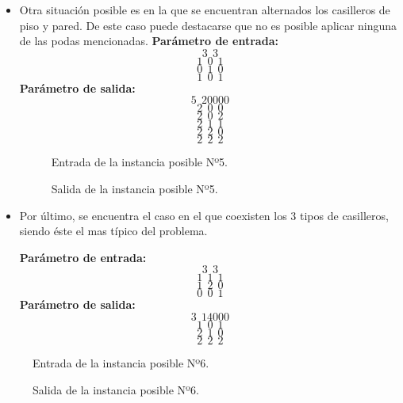 \begin{itemize}
\item Otra situación posible es en la que se encuentran alternados los casilleros de piso y pared. De este caso puede destacarse que no es posible aplicar ninguna de las podas mencionadas.\newline
\textbf{Parámetro de entrada:} 
$$3\ \ 3$$
$$1\ \ 0\ \ 1$$
$$0\ \ 1\ \ 0$$
$$1\ \ 0\ \ 1$$
\textbf{Parámetro de salida:} 
$$5\ \ 20000$$
$$2\ \ 0\ \ 0$$
$$2\ \ 0\ \ 2$$
$$2\ \ 1\ \ 1$$
$$2\ \ 2\ \ 0$$
$$2\ \ 2\ \ 2$$

\begin{figure}[H] %
\hfill
\begin{minipage}[t]{.45\textwidth}
\begin{center}
\caption{Entrada de la instancia posible Nº5.}
\label{fig-tc1}
\end{center}
\end{minipage}
\hfill
\begin{minipage}[t]{.45\textwidth}
\begin{center}
\caption{Salida de la instancia posible Nº5.}
\label{fig-tc2}
\end{center}
\end{minipage}
\hfill
\end{figure}

\item Por último, se encuentra el caso en el que coexisten los 3 tipos de casilleros, siendo éste el mas típico del problema. \newline

\textbf{Parámetro de entrada:} 
$$3\ \ 3$$
$$1\ \ 1\ \ 1$$
$$1\ \ 2\ \ 0$$
$$0\ \ 0\ \ 1$$
\textbf{Parámetro de salida:} 
$$3\ \ 14000$$
$$1\ \ 0\ \ 1$$
$$2\ \ 1\ \ 0$$
$$2\ \ 2\ \ 2$$
\newline
\end{itemize}

\begin{figure}[H] %
\hfill
\begin{minipage}[t]{.45\textwidth}
\begin{center}
\caption{Entrada de la instancia posible Nº6.}
\label{fig-tc1}
\end{center}
\end{minipage}
\hfill
\begin{minipage}[t]{.45\textwidth}
\begin{center}
\caption{Salida de la instancia posible Nº6.}
\label{fig-tc2}
\end{center}
\end{minipage}
\hfill
\end{figure}

